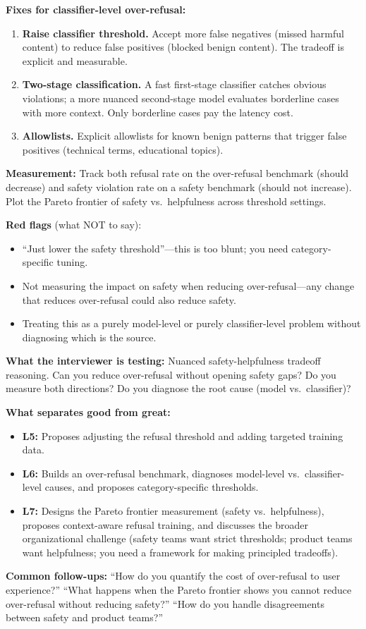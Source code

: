 \begin{interviewq}
\textbf{Fixes for classifier-level over-refusal:}
\begin{enumerate}
    \item \textbf{Raise classifier threshold.} Accept more false negatives (missed harmful content) to reduce false positives (blocked benign content). The tradeoff is explicit and measurable.
    \item \textbf{Two-stage classification.} A fast first-stage classifier catches obvious violations; a more nuanced second-stage model evaluates borderline cases with more context. Only borderline cases pay the latency cost.
    \item \textbf{Allowlists.} Explicit allowlists for known benign patterns that trigger false positives (technical terms, educational topics).
\end{enumerate}

\textbf{Measurement:} Track both refusal rate on the over-refusal benchmark (should decrease) and safety violation rate on a safety benchmark (should not increase). Plot the Pareto frontier of safety vs.\ helpfulness across threshold settings.

\textbf{Red flags} (what NOT to say):
\begin{itemize}
    \item ``Just lower the safety threshold''---this is too blunt; you need category-specific tuning.
    \item Not measuring the impact on safety when reducing over-refusal---any change that reduces over-refusal could also reduce safety.
    \item Treating this as a purely model-level or purely classifier-level problem without diagnosing which is the source.
\end{itemize}

\textbf{What the interviewer is testing:} Nuanced safety-helpfulness tradeoff reasoning. Can you reduce over-refusal without opening safety gaps? Do you measure both directions? Do you diagnose the root cause (model vs.\ classifier)?

\textbf{What separates good from great:}
\begin{itemize}
    \item \textbf{L5:} Proposes adjusting the refusal threshold and adding targeted training data.
    \item \textbf{L6:} Builds an over-refusal benchmark, diagnoses model-level vs.\ classifier-level causes, and proposes category-specific thresholds.
    \item \textbf{L7:} Designs the Pareto frontier measurement (safety vs.\ helpfulness), proposes context-aware refusal training, and discusses the broader organizational challenge (safety teams want strict thresholds; product teams want helpfulness; you need a framework for making principled tradeoffs).
\end{itemize}

\textbf{Common follow-ups:} ``How do you quantify the cost of over-refusal to user experience?'' ``What happens when the Pareto frontier shows you cannot reduce over-refusal without reducing safety?'' ``How do you handle disagreements between safety and product teams?''
\end{interviewq}

